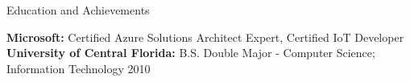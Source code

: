 \documentclass{resume} %
\begin{document}
\vspace{0.5em} %
\begin{rSection}{Education and Achievements}

{\bf Microsoft: } Certified Azure Solutions Architect Expert, Certified IoT Developer \hfill \\ 
{\bf University of Central Florida:} B.S. Double Major - Computer Science; Information Technology  \hfill 2010 \\ 
\end{rSection}
\end{document}
